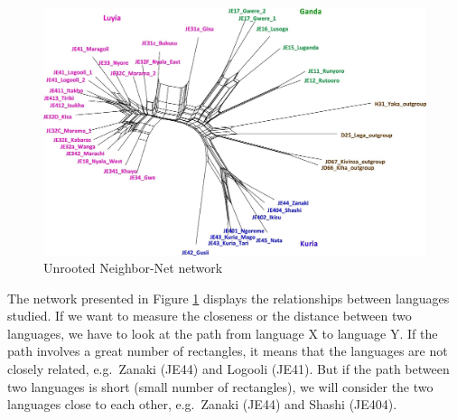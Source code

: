 \documentclass[output=paper]{langscibook}
\begin{document}
\begin{figure}
  \caption{Unrooted Neighbor-Net network}
  \label{fig:13:NeighborNet}
   \includegraphics[width=\textwidth]{figures/13 Unrooted Neighbor-Net network.jpg}
\end{figure}

The network presented in Figure \ref{fig:13:NeighborNet} displays the relationships between languages studied. If we want to measure the closeness or the distance between two languages, we have to look at the path from language X to language Y. If the path involves a great number of rectangles, it means that the languages are not closely related, e.g.\ Zanaki (JE44) and Logooli (JE41). But if the path between two languages is short (small number of rectangles), we will consider the two languages close to each other, e.g.\ Zanaki (JE44) and Shashi (JE404).
\end{document}
